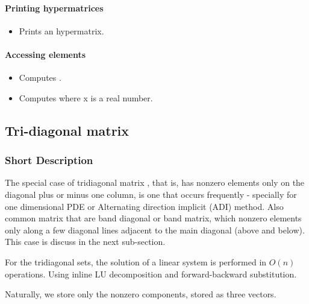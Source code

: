 \paragraph{Printing hypermatrices}

\begin{itemize}
\item {}
  \sshortdescribe Prints an hypermatrix.
\end{itemize}

\paragraph{Accessing elements}

\begin{itemize}
\item {}
  \sshortdescribe Computes .
  
\item {}
  \sshortdescribe Computes  where x is a real number.
\end{itemize}



\subsection{Tri-diagonal matrix}
\subsubsection{Short Description}

The special case of tridiagonal matrix , that is, has nonzero elements only on
the diagonal plus or minus one column, is one that occurs frequently - specially
for one dimensional PDE or Alternating direction implicit (ADI) method. Also
common matrix that are band diagonal or band matrix, which nonzero elements
only along a few diagonal lines adjacent to the main diagonal (above and
below). This case is discuss in the next sub-section.

For the tridiagonal sets, the solution of a linear system is performed in $O(n)$
operations. Using inline LU decomposition and forward-backward substitution.

Naturally, we store only the nonzero components, stored as three vectors.

